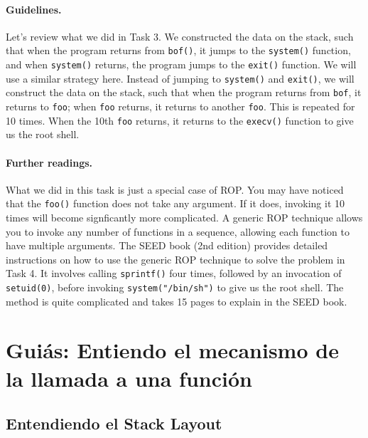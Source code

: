 \paragraph{Guidelines.} Let's review what we did in Task 3. We constructed the 
data on the stack, such that when the program returns 
from \texttt{bof()}, it jumps to the \texttt{system()} function, and 
when \texttt{system()} returns, the program jumps to the \texttt{exit()} function.  
We will use a similar strategy here. Instead of jumping to \texttt{system()} 
and \texttt{exit()}, we will construct the data on the stack, such that
when the program returns from \texttt{bof}, it returns  
to \texttt{foo}; when \texttt{foo} returns, it returns to another \texttt{foo}.
This is repeated for 10 times. When the 10th \texttt{foo} returns, it returns 
to the \texttt{execv()} function to give us the root shell.  



\paragraph{Further readings.} What we did in this task is just a special case of ROP.
You may have noticed that the \texttt{foo()} function does not take any
argument. If it does, invoking it 10 times will become signficantly more 
complicated. A generic ROP technique allows you to invoke any number of functions
in a sequence, allowing each function to have multiple arguments. 
The SEED book (2nd edition) provides detailed instructions on how to 
use the generic ROP technique to solve the problem in Task 4. It involves 
calling \texttt{sprintf()} four times, followed by an invocation of 
\texttt{setuid(0)}, before invoking \texttt{system("/bin/sh")} to give 
us the root shell. The method is quite complicated and takes 15 pages 
to explain in the SEED book.



\section{Guiás: Entiendo el mecanismo de la llamada a una función}


\subsection{Entendiendo el Stack Layout}

